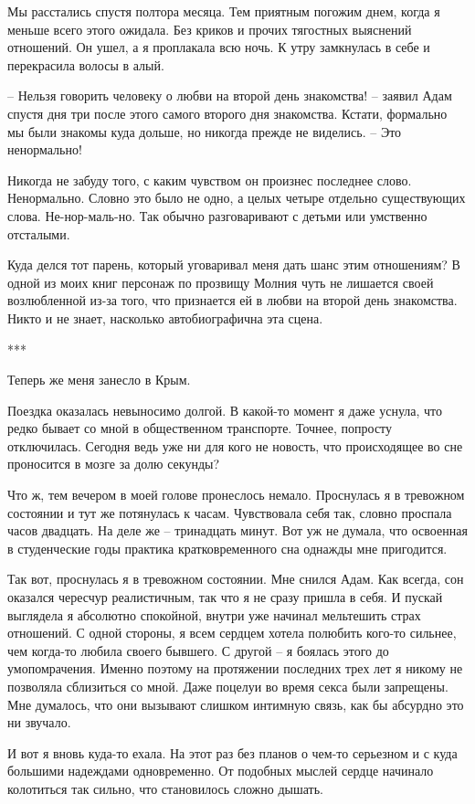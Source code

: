 \documentclass[
]{book}
\begin{document}
Мы расстались спустя полтора месяца. Тем приятным погожим днем, когда я меньше всего этого ожидала. Без криков и прочих тягостных выяснений отношений. Он ушел, а я проплакала всю ночь. К утру замкнулась в себе и перекрасила волосы в алый.

-- Нельзя говорить человеку о любви на второй день знакомства! -- заявил Адам спустя дня три после этого самого второго дня знакомства. Кстати, формально мы были знакомы куда дольше, но никогда прежде не виделись. -- Это ненормально!

Никогда не забуду того, с каким чувством он произнес последнее слово. Ненормально. Словно это было не одно, а целых четыре отдельно существующих слова. Не-нор-маль-но. Так обычно разговаривают с детьми или умственно отсталыми.

Куда делся тот парень, который уговаривал меня дать шанс этим отношениям? В одной из моих книг персонаж по прозвищу Молния чуть не лишается своей возлюбленной из-за того, что признается ей в любви на второй день знакомства. Никто и не знает, насколько автобиографична эта сцена.

***

Теперь же меня занесло в Крым.

Поездка оказалась невыносимо долгой. В какой-то момент я даже уснула, что редко бывает со мной в общественном транспорте. Точнее, попросту отключилась. Сегодня ведь уже ни для кого не новость, что происходящее во сне проносится в мозге за долю секунды?

Что ж, тем вечером в моей голове пронеслось немало. Проснулась я в тревожном состоянии и тут же потянулась к часам. Чувствовала себя так, словно проспала часов двадцать. На деле же -- тринадцать минут. Вот уж не думала, что освоенная в студенческие годы практика кратковременного сна однажды мне пригодится.

Так вот, проснулась я в тревожном состоянии. Мне снился Адам. Как всегда, сон оказался чересчур реалистичным, так что я не сразу пришла в себя. И пускай выглядела я абсолютно спокойной, внутри уже начинал мельтешить страх отношений. С одной стороны, я всем сердцем хотела полюбить кого-то сильнее, чем когда-то любила своего бывшего. С другой -- я боялась этого до умопомрачения. Именно поэтому на протяжении последних трех лет я никому не позволяла сблизиться со мной. Даже поцелуи во время секса были запрещены. Мне думалось, что они вызывают слишком интимную связь, как бы абсурдно это ни звучало.

И вот я вновь куда-то ехала. На этот раз без планов о чем-то серьезном и с куда большими надеждами одновременно. От подобных мыслей сердце начинало колотиться так сильно, что становилось сложно дышать.
\end{document}
